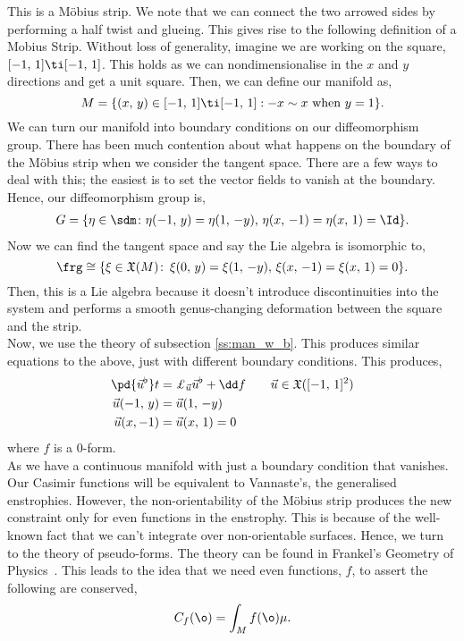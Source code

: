 \noindent
This is a M\"obius strip. We note that we can connect the two arrowed sides by performing a half twist and glueing. This gives rise to the following definition of a Mobius Strip. Without loss of generality, imagine we are working on the square, $[-1,\,1]\ti[-1,\,1]$. This holds as we can nondimensionalise in the $x$ and $y$ directions and get a unit square. Then, we can define our manifold as,
$$ M = \{(x,\,y) \in [-1,\,1]\ti[-1,\,1] : -x \sim x \text{ when } y = 1\}. $$
We can turn our manifold into boundary conditions on our diffeomorphism group. There has been much contention about what happens on the boundary of the M\"obius strip when we consider the tangent space. There are a few ways to deal with this; the easiest is to set the vector fields to vanish at the boundary. Hence, our diffeomorphism group is,
\begin{align*}
  G = \{\eta \in\sdm  \colon \eta(-1,\,y) = \eta(1,\, -y),\, \eta(x,\,-1) = \eta(x,\,1) = \Id\}.
\end{align*}
\noindent
Now we can find the tangent space and say the Lie algebra is isomorphic to,
$$ \frg \cong \{\xi \in \mathfrak{X}(M)\colon\, \xi(0,\,y) = \xi(1,\,-y),\, \xi(x,\,-1) = \xi(x,\, 1) = 0\}. $$
Then, this is a Lie algebra because it doesn't introduce discontinuities into the system and performs a smooth genus-changing deformation between the square and the strip.\\

\noindent
Now, we use the theory of subsection \ref{ss:man_w_b}. This produces similar equations to the above, just with different boundary conditions. This produces,
\begin{equation}
  \begin{split}
    \pd {\vec u^\flat} t &= \pounds_{\vec u} \vec u^\flat + \dd f \qquad \vec u \in \mathfrak{X}([-1,\,1]^2)\\
    \vec u(-1,\,y) &= \vec u(1,\, -y) \\
    \vec u(x,-1) &= \vec u(x,\,1) = 0
  \end{split}
\end{equation}
where $f$ is a $0$-form.\\

\noindent
As we have a continuous manifold with just a boundary condition that vanishes. Our Casimir functions will be equivalent to Vannaste's, the generalised enstrophies. However, the non-orientability of the M\"obius strip produces the new constraint only for even functions in the enstrophy. This is because of the well-known fact that we can't integrate over non-orientable surfaces. Hence, we turn to the theory of pseudo-forms. The theory can be found in Frankel's Geometry of Physics~\cite{frankel}. This leads to the idea that we need even functions, $f$, to assert the following are conserved,
$$ C_f(\o) = \int_M f(\o)\mu. $$

